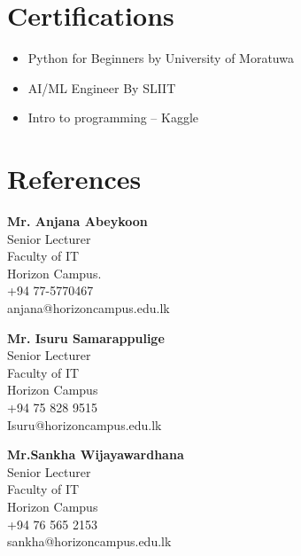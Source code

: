 \documentclass[10pt,a4paper]{article}
\begin{document}
\section{Certifications}
 \begin{itemize}
  \item Python for Beginners by University of Moratuwa
  \item AI/ML Engineer By SLIIT
  \item Intro to programming -- Kaggle
 \end{itemize}

\section{References}
\begin{minipage}[t]{0.3\textwidth}
\textbf{Mr. Anjana Abeykoon} \\
Senior Lecturer \\
Faculty of IT \\
Horizon Campus. \\
+94 77-5770467 \\
anjana@horizoncampus.edu.lk
\end{minipage}
\hfill
\begin{minipage}[t]{0.3\textwidth}
  \textbf{Mr. Isuru Samarappulige} \\
  Senior Lecturer \\
  Faculty of IT \\
  Horizon Campus \\
  +94 75 828 9515 \\
  Isuru@horizoncampus.edu.lk \\
\end{minipage}
\hfill
\begin{minipage}[t]{0.3\textwidth}
  \textbf{Mr.Sankha Wijayawardhana} \\
  Senior Lecturer \\
  Faculty of IT \\
  Horizon Campus \\
  +94 76 565 2153 \\
  sankha@horizoncampus.edu.lk
\end{minipage}
\end{document}
